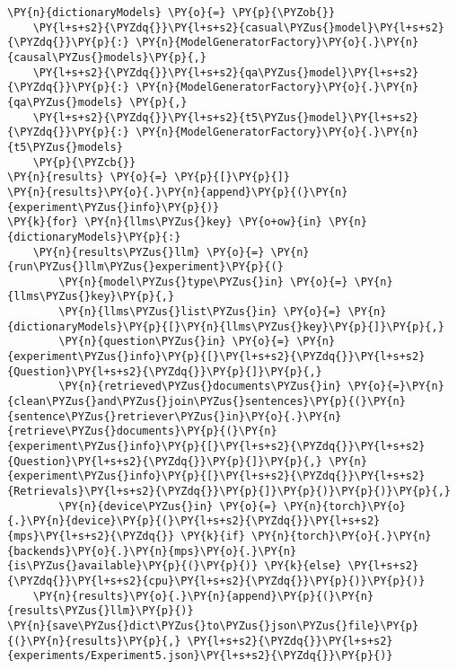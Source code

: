 \documentclass[11pt]{wseas}
\begin{document}
\begin{tcolorbox}[breakable, size=fbox, boxrule=1pt, pad at break*=1mm,colback=cellbackground, colframe=cellborder]
\begin{Verbatim}[commandchars=\\\{\}]
\PY{n}{dictionaryModels} \PY{o}{=} \PY{p}{\PYZob{}}
    \PY{l+s+s2}{\PYZdq{}}\PY{l+s+s2}{casual\PYZus{}model}\PY{l+s+s2}{\PYZdq{}}\PY{p}{:} \PY{n}{ModelGeneratorFactory}\PY{o}{.}\PY{n}{causal\PYZus{}models}\PY{p}{,} 
    \PY{l+s+s2}{\PYZdq{}}\PY{l+s+s2}{qa\PYZus{}model}\PY{l+s+s2}{\PYZdq{}}\PY{p}{:} \PY{n}{ModelGeneratorFactory}\PY{o}{.}\PY{n}{qa\PYZus{}models} \PY{p}{,}
    \PY{l+s+s2}{\PYZdq{}}\PY{l+s+s2}{t5\PYZus{}model}\PY{l+s+s2}{\PYZdq{}}\PY{p}{:} \PY{n}{ModelGeneratorFactory}\PY{o}{.}\PY{n}{t5\PYZus{}models} 
    \PY{p}{\PYZcb{}}
\PY{n}{results} \PY{o}{=} \PY{p}{[}\PY{p}{]}
\PY{n}{results}\PY{o}{.}\PY{n}{append}\PY{p}{(}\PY{n}{experiment\PYZus{}info}\PY{p}{)}
\PY{k}{for} \PY{n}{llms\PYZus{}key} \PY{o+ow}{in} \PY{n}{dictionaryModels}\PY{p}{:}
    \PY{n}{results\PYZus{}llm} \PY{o}{=} \PY{n}{run\PYZus{}llm\PYZus{}experiment}\PY{p}{(}
        \PY{n}{model\PYZus{}type\PYZus{}in} \PY{o}{=} \PY{n}{llms\PYZus{}key}\PY{p}{,}
        \PY{n}{llms\PYZus{}list\PYZus{}in} \PY{o}{=} \PY{n}{dictionaryModels}\PY{p}{[}\PY{n}{llms\PYZus{}key}\PY{p}{]}\PY{p}{,}
        \PY{n}{question\PYZus{}in} \PY{o}{=} \PY{n}{experiment\PYZus{}info}\PY{p}{[}\PY{l+s+s2}{\PYZdq{}}\PY{l+s+s2}{Question}\PY{l+s+s2}{\PYZdq{}}\PY{p}{]}\PY{p}{,}
        \PY{n}{retrieved\PYZus{}documents\PYZus{}in} \PY{o}{=}\PY{n}{clean\PYZus{}and\PYZus{}join\PYZus{}sentences}\PY{p}{(}\PY{n}{sentence\PYZus{}retriever\PYZus{}in}\PY{o}{.}\PY{n}{retrieve\PYZus{}documents}\PY{p}{(}\PY{n}{experiment\PYZus{}info}\PY{p}{[}\PY{l+s+s2}{\PYZdq{}}\PY{l+s+s2}{Question}\PY{l+s+s2}{\PYZdq{}}\PY{p}{]}\PY{p}{,} \PY{n}{experiment\PYZus{}info}\PY{p}{[}\PY{l+s+s2}{\PYZdq{}}\PY{l+s+s2}{Retrievals}\PY{l+s+s2}{\PYZdq{}}\PY{p}{]}\PY{p}{)}\PY{p}{)}\PY{p}{,}
        \PY{n}{device\PYZus{}in} \PY{o}{=} \PY{n}{torch}\PY{o}{.}\PY{n}{device}\PY{p}{(}\PY{l+s+s2}{\PYZdq{}}\PY{l+s+s2}{mps}\PY{l+s+s2}{\PYZdq{}} \PY{k}{if} \PY{n}{torch}\PY{o}{.}\PY{n}{backends}\PY{o}{.}\PY{n}{mps}\PY{o}{.}\PY{n}{is\PYZus{}available}\PY{p}{(}\PY{p}{)} \PY{k}{else} \PY{l+s+s2}{\PYZdq{}}\PY{l+s+s2}{cpu}\PY{l+s+s2}{\PYZdq{}}\PY{p}{)}\PY{p}{)}
    \PY{n}{results}\PY{o}{.}\PY{n}{append}\PY{p}{(}\PY{n}{results\PYZus{}llm}\PY{p}{)}
\PY{n}{save\PYZus{}dict\PYZus{}to\PYZus{}json\PYZus{}file}\PY{p}{(}\PY{n}{results}\PY{p}{,} \PY{l+s+s2}{\PYZdq{}}\PY{l+s+s2}{experiments/Experiment5.json}\PY{l+s+s2}{\PYZdq{}}\PY{p}{)}  
\end{Verbatim}
\end{tcolorbox}


    
    
    
\end{document}
